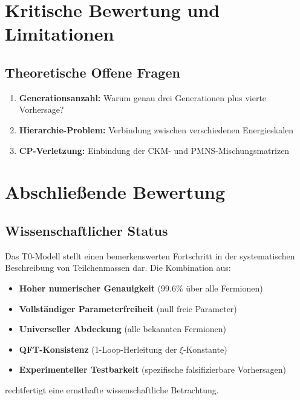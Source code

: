 	\section{Kritische Bewertung und Limitationen}
	\label{sec:kritische_bewertung}
	
	\subsection{Theoretische Offene Fragen}
	\label{subsec:offene_fragen}
	
	\begin{enumerate}
		\item \textbf{Generationsanzahl:} Warum genau drei Generationen plus vierte Vorhersage?
		\item \textbf{Hierarchie-Problem:} Verbindung zwischen verschiedenen Energieskalen
		\item \textbf{CP-Verletzung:} Einbindung der CKM- und PMNS-Mischungsmatrizen
	\end{enumerate}
	
	\section{Abschließende Bewertung}
	\label{sec:abschliessende_bewertung}
	
	\subsection{Wissenschaftlicher Status}
	\label{subsec:wissenschaftlicher_status}
	
	Das T0-Modell stellt einen bemerkenswerten Fortschritt in der systematischen Beschreibung von Teilchenmassen dar. Die Kombination aus:
	
	\begin{itemize}
		\item \textbf{Hoher numerischer Genauigkeit} (99.6\% über alle Fermionen)
		\item \textbf{Vollständiger Parameterfreiheit} (null freie Parameter)
		\item \textbf{Universeller Abdeckung} (alle bekannten Fermionen)
		\item \textbf{QFT-Konsistenz} (1-Loop-Herleitung der $\xi$-Konstante)
		\item \textbf{Experimenteller Testbarkeit} (spezifische falsifizierbare Vorhersagen)
	\end{itemize}
	
	rechtfertigt eine ernsthafte wissenschaftliche Betrachtung.
	
